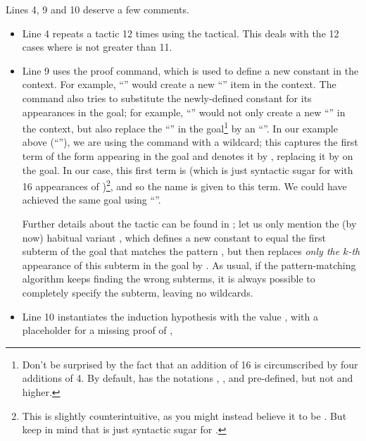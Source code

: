 Lines 4, 9 and 10 deserve a few comments.
\begin{itemize}
\item Line 4 repeats a tactic 12 times using the  tactical.
This deals with the 12 cases where  is not greater than 11.
\item Line 9 uses the  proof command, which is used to define a new
constant in the context. For example, ``'' would
create a new ``'' item in the context. The
command also tries to substitute the newly-defined constant for its
appearances in the goal; for example, ``'' would not
only create a new ``'' in the context, but also
replace the ``'' in the goal\footnote{Don't be
surprised by the fact that an addition of 16 is circumscribed by four
additions of 4. By default, \mcbMC{} has the notations ,
,  and  pre-defined, but not  and higher.}
by an ``''. In our example above
(``''), we are using the
 command with a wildcard; this captures the first term of the
form  appearing in the goal and denotes it by , replacing
it by  on the goal. In our case, this first term is
 (which is just syntactic sugar for
 with 16 appearances of )\footnote{This is
slightly counterintuitive, as you
might instead believe it to be . But keep in mind
that  is just syntactic sugar for
.},
and so the name  is given to this term. We could have achieved
the same goal using ``''.
\par
Further details about the  tactic can be found in
\cite[\S 4.2]{ssrman}; let us only mention the (by now) habitual
variant , which defines a new constant
 to equal the first subterm of the goal that matches the pattern
, but then replaces \emph{only the \(k\)-th} appearance
of this subterm in the goal by . As usual, if the
pattern-matching algorithm keeps finding the wrong subterms, it is
always possible to completely specify the subterm, leaving no
wildcards.
\item Line 10 instantiates the induction hypothesis with the value
, with a placeholder for a missing proof of ,

\end{itemize}
